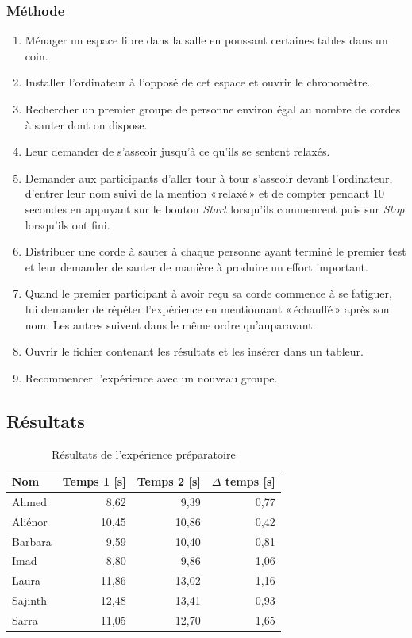 \documentclass[12pt,fleqn,oneside,french,openany]{book} %
\begin{document}
\subsubsection{Méthode} \label{sssec:methode2.1}
\begin{enumerate}
	\item Ménager un espace libre dans la salle en poussant certaines tables dans un coin.
	\item Installer l'ordinateur à l'opposé de cet espace et ouvrir le chronomètre.
	\item Rechercher un premier groupe de personne environ égal au nombre de cordes à sauter dont on dispose.
	\item Leur demander de s'asseoir jusqu'à ce qu'ils se sentent relaxés.
	\item Demander aux participants d'aller tour à tour s'asseoir devant l'ordinateur, d'entrer leur nom suivi de la mention «\,relaxé\,» et de compter pendant 10 secondes en appuyant sur le bouton \emph{Start} lorsqu'ils commencent puis sur \emph{Stop} lorsqu'ils ont fini.
	\item Distribuer une corde à sauter à chaque personne ayant terminé le premier test et leur demander de sauter de manière à produire un effort important.
	\item Quand le premier participant à avoir reçu sa corde commence à se fatiguer, lui demander de répéter l'expérience en mentionnant «\,échauffé\,» après son nom. Les autres suivent dans le même ordre qu'auparavant.
	\item Ouvrir le fichier contenant les résultats et les insérer dans un tableur.
	\item Recommencer l'expérience avec un nouveau groupe.
\end{enumerate}

\subsection{Résultats} \label{ssec:resultats2.1}

\begin{table}[h]
	\centering
	\caption{Résultats de l'expérience préparatoire} \label{tbl:exp2.1}
	\begin{tabular}{lrrr}
		\toprule 
		\textbf{Nom} & \textbf{Temps 1 [s]} & \textbf{Temps 2 [s]} & \textbf{$\Delta$ temps [s]} \\ \midrule
		Ahmed & 8,62 & 9,39 & 0,77 \\
		Aliénor & 10,45 & 10,86 & 0,42 \\
		Barbara & 9,59 & 10,40 & 0,81 \\
		Imad & 8,80 & 9,86 & 1,06 \\
		Laura & 11,86 & 13,02 & 1,16 \\
		Sajinth & 12,48 & 13,41 & 0,93 \\
		Sarra & 11,05 & 12,70 & 1,65 \\ \bottomrule
	\end{tabular}
\end{table}
\clearpage
\end{document}
